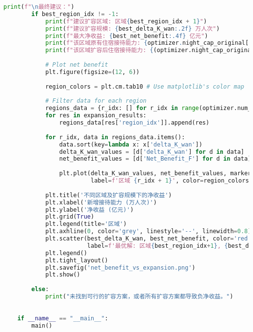\begin{lstlisting}[language=Python]
        print(f"\n最终建议：")
        if best_region_idx != -1:
            print(f"建议扩容区域: 区域{best_region_idx + 1}")
            print(f"建议扩容规模: {best_delta_K_wan:.2f} 万人次")
            print(f"最大净收益: {best_net_benefit:.4f} 亿元")
            print(f"该区域原有住宿接待能力: {optimizer.night_cap_original[best_region_idx]/10000:.2f} 万人次")
            print(f"该区域扩容后住宿接待能力: {(optimizer.night_cap_original[best_region_idx] + best_delta_K_wan * 10000)/10000:.2f} 万人次")
    
            # Plot net benefit
            plt.figure(figsize=(12, 6))
            
            region_colors = plt.cm.tab10 # Use matplotlib's color map
            
            # Filter data for each region
            regions_data = {r_idx: [] for r_idx in range(optimizer.num_regions)}
            for res in expansion_results:
                regions_data[res['region_idx']].append(res)
            
            for r_idx, data in regions_data.items():
                data.sort(key=lambda x: x['delta_K_wan'])
                delta_K_wan_values = [d['delta_K_wan'] for d in data]
                net_benefit_values = [d['Net_Benefit_F'] for d in data]
                
                plt.plot(delta_K_wan_values, net_benefit_values, marker='o', linestyle='-',
                         label=f'区域 {r_idx + 1}', color=region_colors(r_idx))
            
            plt.title('不同区域及扩容规模下的净收益')
            plt.xlabel('新增接待能力 (万人次)')
            plt.ylabel('净收益 (亿元)')
            plt.grid(True)
            plt.legend(title='区域')
            plt.axhline(0, color='grey', linestyle='--', linewidth=0.8) # Zero benefit line
            plt.scatter(best_delta_K_wan, best_net_benefit, color='red', marker='X', s=200, 
                        label=f'最优解: 区域{best_region_idx+1}, {best_delta_K_wan:.2f}万人次, {best_net_benefit:.4f}亿元')
            plt.legend()
            plt.tight_layout()
            plt.savefig('net_benefit_vs_expansion.png')
            plt.show()
    
        else:
            print("未找到可行的扩容方案，或者所有扩容方案都导致负净收益。")
    
    
    if __name__ == "__main__":
        main()
    
\end{lstlisting}

